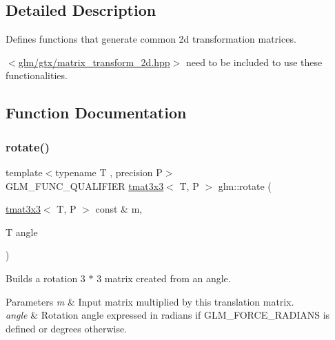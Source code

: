 \subsection{Detailed Description}
Defines functions that generate common 2d transformation matrices. 

$<$\hyperlink{matrix__transform__2d_8hpp}{glm/gtx/matrix\+\_\+transform\+\_\+2d.\+hpp}$>$ need to be included to use these functionalities. 

\subsection{Function Documentation}
\mbox{\label{group__gtx__matrix__transform__2d_ga23ec870ee4b75d85cc021e0fd1532b48}} 
\subsubsection{\texorpdfstring{rotate()}{rotate()}}
{\footnotesize\ttfamily template$<$typename T , precision P$>$ \\
G\+L\+M\+\_\+\+F\+U\+N\+C\+\_\+\+Q\+U\+A\+L\+I\+F\+I\+ER \hyperlink{structglm_1_1tmat3x3}{tmat3x3}$<$ T, P $>$ glm\+::rotate (\begin{DoxyParamCaption}\item[{\hyperlink{structglm_1_1tmat3x3}{tmat3x3}$<$ T, P $>$ const \&}]{m,  }\item[{T}]{angle }\end{DoxyParamCaption})}

Builds a rotation 3 $\ast$ 3 matrix created from an angle.


\begin{DoxyParams}{Parameters}
{\em m} & Input matrix multiplied by this translation matrix. \\
\hline
{\em angle} & Rotation angle expressed in radians if G\+L\+M\+\_\+\+F\+O\+R\+C\+E\+\_\+\+R\+A\+D\+I\+A\+NS is defined or degrees otherwise. \\
\hline
\end{DoxyParams}
\mbox{\label{group__gtx__matrix__transform__2d_gadb9f2a729d399ae5e9c33eb64d0d66fe}} 

